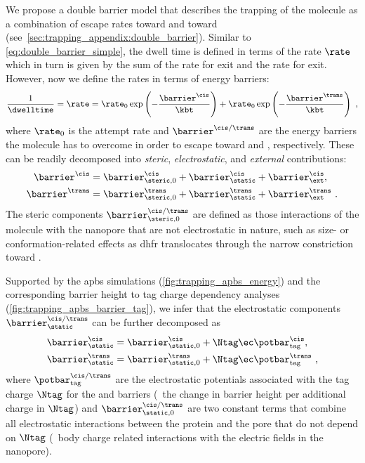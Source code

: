 We propose a double barrier model that describes the trapping of the molecule as a combination of escape rates
toward \cisi{} and toward \transi{} (see~\cref{sec:trapping_appendix:double_barrier}). Similar to
\cref{eq:double_barrier_simple}, the dwell time is defined in terms of the rate $\rate$ which in turn is given
by the sum of the rate for \cisi{} exit and the rate for \transi{} exit. However, now we define the rates in
terms of energy barriers:
%
\begin{align}\label{eq:double_barrier}
    \frac{1}{\dwelltime} = \rate =
        \rate_0 \exp \left( - \dfrac{\barrier^{\cis}}{\kbt} \right)
        + \rate_0 \exp \left( - \dfrac{\barrier^{\trans}}{\kbt} \right)
    \text{ ,}
\end{align}
%
where $\rate_0$ is the attempt rate and $\barrier^{\cis/\trans}$ are the energy barriers the molecule has to
overcome in order to escape toward \cisi{} and \transi{}, respectively. These can be readily decomposed into
\emph{steric}, \emph{electrostatic}, and \emph{external} contributions:
%
\begin{subequations}\label{eq:decomposition}
\begin{align}
  \barrier^{\cis} ={}&
    \barrier^{\cis}_{\steric,0}
    + \barrier^{\cis}_\static
    + \barrier^{\cis}_\ext, \\
  \barrier^{\trans} ={}&
    \barrier^{\trans}_{\steric,0}
    + \barrier^{\trans}_\static
    + \barrier^{\trans}_\ext
  \text{ .}
\end{align}
\end{subequations}
%
The steric components $\barrier^{\cis/\trans}_{\steric,0}$ are defined as those interactions of the molecule
with the nanopore that are not electrostatic in nature, such as size- or conformation-related effects as
\gls{dhfr} translocates through the narrow constriction toward \transi{}.

Supported by the \gls{apbs} simulations (\cref{fig:trapping_apbs_energy}) and the corresponding barrier
height to tag charge dependency analyses (\cref{fig:trapping_apbs_barrier_tag}), we infer that the
electrostatic components $\barrier^{\cis/\trans}_{\static}$ can be further decomposed as
%
\begin{subequations}\label{eq:static-barrier}
\begin{align}
	\barrier^{\cis}_\static ={}&
			\barrier^{\cis}_{\static,0}
			+ \Ntag \ec \potbar_{\rm{tag}}^{\cis},\\
	\barrier^{\trans}_\static ={}&
			\barrier^{\trans}_{\static,0}
      + \Ntag \ec \potbar_{\rm{tag}}^{\trans}
  \text{ ,}
\end{align}
\end{subequations}
%
where $\potbar_{\rm{tag}}^{\cis/\trans}$ are the electrostatic potentials associated with the tag charge
$\Ntag$ for the \cisi{} and \transi{} barriers (\ie~the change in barrier height per additional charge in
$\Ntag$) and $\barrier^{\cis/\trans}_{\static,0}$ are two constant terms that combine all electrostatic
interactions between the protein and the pore that do not depend on $\Ntag$ (\eg~body charge related
interactions with the electric fields in the nanopore).


